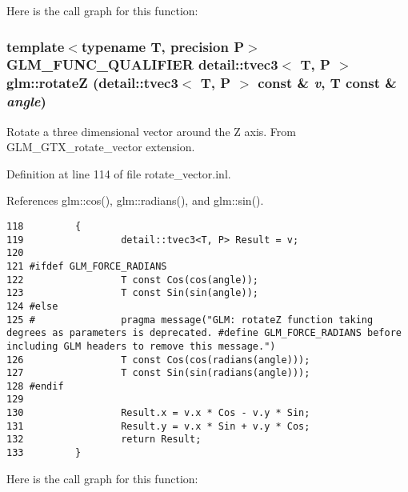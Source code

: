 Here is the call graph for this function:\hypertarget{group__gtx__rotate__vector_g67b56c3da73e7da777810b2a82bab4f8}{
\subsubsection[rotateZ]{\setlength{\rightskip}{0pt plus 5cm}template$<$typename T, precision P$>$ GLM\_\-FUNC\_\-QUALIFIER detail::tvec3$<$ T, P $>$ glm::rotateZ (detail::tvec3$<$ T, P $>$ const \& {\em v}, \/  T const \& {\em angle})}}
\label{group__gtx__rotate__vector_g67b56c3da73e7da777810b2a82bab4f8}


Rotate a three dimensional vector around the Z axis. From GLM\_\-GTX\_\-rotate\_\-vector extension. 

Definition at line 114 of file rotate\_\-vector.inl.

References glm::cos(), glm::radians(), and glm::sin().

\begin{Code}\begin{verbatim}118         {
119                 detail::tvec3<T, P> Result = v;
120 
121 #ifdef GLM_FORCE_RADIANS
122                 T const Cos(cos(angle));
123                 T const Sin(sin(angle));
124 #else
125 #               pragma message("GLM: rotateZ function taking degrees as parameters is deprecated. #define GLM_FORCE_RADIANS before including GLM headers to remove this message.")
126                 T const Cos(cos(radians(angle)));
127                 T const Sin(sin(radians(angle)));
128 #endif
129 
130                 Result.x = v.x * Cos - v.y * Sin;
131                 Result.y = v.x * Sin + v.y * Cos;
132                 return Result;
133         }
\end{verbatim}
\end{Code}




Here is the call graph for this function: